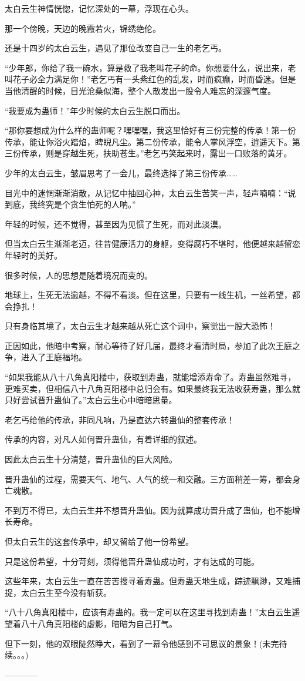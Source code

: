 \begin{this_body}
太白云生神情恍惚，记忆深处的一幕，浮现在心头。

那一个傍晚，天边的晚霞若火，锦绣绝伦。

还是十四岁的太白云生，遇见了那位改变自己一生的老乞丐。

“少年郎，你给了我一碗水，算是救了我老叫花子的命。你想要什么，说出来，老叫花子必全力满足你！”老乞丐有一头紫红色的乱发，时而疯癫，时而昏迷。但是当他清醒的时候，目光沧桑似海，整个人散发出一股令人难忘的深邃气度。

“我要成为蛊师！”年少时候的太白云生脱口而出。

“那你要想成为什么样的蛊师呢？嘿嘿嘿，我这里恰好有三份完整的传承！第一份传承，能让你浴火踏焰，睥睨凡尘。第二份传承，能令人掌风浮空，逍遥天下。第三份传承，则是穿越生死，扶助苍生。”老乞丐笑起来时，露出一口败落的黄牙。

少年的太白云生，皱眉思考了一会儿，最终选择了第三份传承……

目光中的迷惘渐渐消散，从记忆中抽回心神，太白云生苦笑一声，轻声喃喃：“说到底，我终究是个贪生怕死的人呐。”

年轻的时候，还不觉得，甚至因为见惯了生死，而对此淡漠。

但当太白云生渐渐老迈，往昔健康活力的身躯，变得腐朽不堪时，他便越来越留恋年轻时的美好。

很多时候，人的思想是随着境况而变的。

地球上，生死无法逾越，不得不看淡。但在这里，只要有一线生机，一丝希望，都会挣扎！

只有身临其境了，太白云生才越来越从死亡这个词中，察觉出一股大恐怖！

正因如此，他暗中考察，耐心等待了好几届，最终才看清时局，参加了此次王庭之争，进入了王庭福地。

“如果我能从八十八角真阳楼中，获取到寿蛊，就能增添寿命了。寿蛊虽然难寻，更难买卖，但相信八十八角真阳楼中总归会有。如果最终我无法收获寿蛊，那么就只好尝试晋升蛊仙了。”太白云生心中暗暗思量。

老乞丐给他的传承，非同凡响，乃是直达六转蛊仙的整套传承！

传承的内容，对凡人如何晋升蛊仙，有着详细的叙述。

因此太白云生十分清楚，晋升蛊仙的巨大风险。

晋升蛊仙的过程，需要天气、地气、人气的统一和交融。三方面稍差一筹，都会身亡魂散。

不到万不得已，太白云生并不想晋升蛊仙。因为就算成功晋升成了蛊仙，也不能增长寿命。

但太白云生的这套传承中，却又留给了他一份希望。

只是这份希望，十分苛刻，须得他晋升蛊仙成功时，才有达成的可能。

这些年来，太白云生一直在苦苦搜寻着寿蛊。但寿蛊天地生成，踪迹飘渺，又难捕捉，太白云生至今没有斩获。

“八十八角真阳楼中，应该有寿蛊的。我一定可以在这里寻找到寿蛊！”太白云生遥望着八十八角真阳楼的虚影，暗暗为自己打气。

但下一刻，他的双眼陡然睁大，看到了一幕令他感到不可思议的景象！(未完待续。。。)

------------

\end{this_body}

